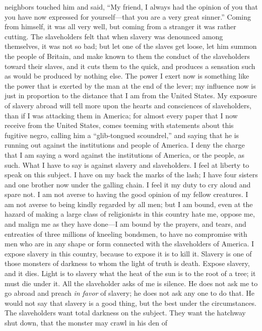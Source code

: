 neighbors touched him and said, ``My friend, I always had the opinion of
you that you have now expressed for yourself---that you are a very great
sinner.'' Coming from himself, it was all very well, but coming from a
stranger it was rather cutting. The slaveholders felt that when slavery
was denounced among themselves, it was not so bad; but let one of the
slaves get loose, let him summon the people of Britain, and make known
to them the conduct of the slaveholders toward their slaves, and it cuts
them to the quick, and produces a sensation such as would be produced by
nothing else. The power I exert now is something like the power that is
exerted by the man at the end of the lever; my influence now is just in
proportion to the distance that I am from the United States. My exposure
of slavery abroad will tell more upon the hearts and consciences of
slaveholders, than if I was attacking them in America; for almost every
paper that I now receive from the United States, comes teeming with
statements about this fugitive negro, calling
{\protect\hypertarget{418}{}{}}him a ``glib-tongued scoundrel,'' and
saying that he is running out against the institutions and people of
America. I deny the charge that I am saying a word against the
institutions of America, or the people, as such. What I have to say is
against slavery and slaveholders. I feel at liberty to speak on this
subject. I have on my back the marks of the lash; I have four sisters
and one brother now under the galling chain. I feel it my duty to cry
aloud and spare not. I am not averse to having the good opinion of my
fellow creatures. I am not averse to being kindly regarded by all men;
but I am bound, even at the hazard of making a large class of
religionists in this country hate me, oppose me, and malign me as they
have done---I am bound by the prayers, and tears, and entreaties of
three millions of kneeling bondsmen, to have no compromise with men who
are in any shape or form connected with the slaveholders of America. I
expose slavery in this country, because to expose it is to kill it.
Slavery is one of those monsters of darkness to whom the light of truth
is death. Expose slavery, and it dies. Light is to slavery what the heat
of the sun is to the root of a tree; it must die under it. All the
slaveholder asks of me is silence. He does not ask me to go abroad and
preach \emph{in favor} of slavery; he does not ask any one to do that.
He would not say that slavery is a good thing, but the best under the
circumstances. The slaveholders want total darkness on the subject. They
want the hatchway shut down, that the monster may crawl in his den of
